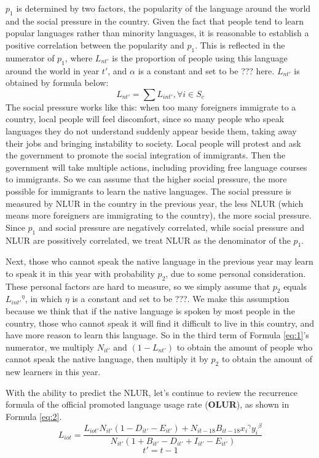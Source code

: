 \documentclass{mcmthesis}
\begin{document}
$p_1$ is determined by two factors, the popularity of the language around the world and the social pressure in the country. Given the fact that people tend to learn popular languages rather than minority languages, it is reasonable to establish a positive correlation between the popularity and $p_1$. This is reflected in the numerator of $p_1$, where $L_{nt'}$ is the proportion of people using this language around the world in year $t'$, and $\alpha$ is a constant and set to be ??? here. $L_{nt'}$ is obtained by formula below:
\begin{equation*}
    L_{nt'}=\sum L_{int'}, \forall i \in S_c
\end{equation*}
The social pressure works like this: when too many foreigners immigrate to a country, local people will feel discomfort, since so many people who speak languages they do not understand suddenly appear beside them, taking away their jobs and bringing instability to society. Local people will protest and ask the government to promote the social integration of immigrants. Then the government will take multiple actions, including providing free language courses to immigrants. So we can assume that the higher social pressure, the more possible for immigrants to learn the native languages. The social pressure is measured by NLUR in the country in the previous year, the less NLUR (which means more foreigners are immigrating to the country), the more social pressure. Since $p_1$ and social pressure are negatively correlated, while social pressure and NLUR are possitively correlated, we treat NLUR as the denominator of the $p_1$.

Next, those who cannot speak the native language in the previous year may learn to speak it in this year with probability $p_2$, due to some personal consideration. These personal factors are hard to measure, so we simply assume that $p_2$ equals ${L_{int'}}^\eta$, in which $\eta$ is a constant and set to be ???. We make this assumption because we think that if the native language is spoken by most people in the country, those who cannot speak it will find it difficult to live in this country, and have more reason to learn this language. So in the third term of Formula \ref{eq:1}'s numerator, we multiply $N_{it'}$ and $(1-L_{nt'})$ to obtain the amount of people who cannot speak the native language, then multiply it by $p_2$ to obtain the amount of new learners in this year.

With the ability to predict the NLUR, let's continue to review the recurrence formula of the official promoted language usage rate (\textbf{OLUR}), as shown in Formula \ref{eq:2}.
\begin{equation} \label{eq:2}
    L_{iot}=\frac{L_{iot'}N_{it'}(1-D_{it'}-E_{it'})+N_{i t-18}B_{it-18}{x_i}^\gamma {y_i}^\beta}{N_{it'}(1+B_{it'}-D_{it'}+I_{it'}-E_{it'})}
\end{equation}
\begin{equation*}
    t'=t-1
\end{equation*}
\end{document}
